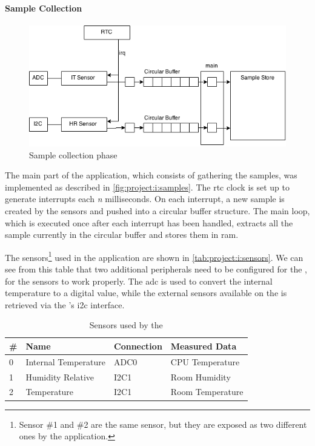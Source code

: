 \paragraph{Sample Collection}
\label{sec:project:i:sample-collection}

\begin{figure}[H]
  \begin{center}
    \includegraphics[scale=0.5]{figures/project-i.png}
  \end{center}
  \caption{Sample collection phase}
  \label{fig:project:i:samples}
\end{figure}

The main part of the application, which consists of gathering the samples, was implemented as described in \autoref{fig:project:i:samples}.
The \gls{rtc} clock is set up to generate interrupts each \emph{n} milliseconds.
On each interrupt, a new sample is created by the sensors and pushed into a circular buffer structure.
The main loop, which is executed once after each interrupt has been handled, extracts all the sample currently in the circular buffer and stores them in \gls{ram}.

The sensors\footnote{Sensor \#1 and \#2 are the same sensor, but they are exposed as two different ones by the application.} used in the application are shown in \autoref{tab:project:i:sensors}.
We can see from this table that two additional peripherals need to be configured for the {\tracker}, for the sensors to work properly.
The \gls{adc} is used to convert the internal temperature to a digital value, while the external sensors available on the {\BIO} is retrieved via the {\gecko}'s \gls{i2c} interface.

\begin{table}[H]
  \centering
  \begin{tabular}{ l | l | l | l }
    \textbf{\#} & \textbf{Name} & \textbf{Connection} & \textbf{Measured Data} \\
    \hline
    0 & Internal Temperature & ADC0 & CPU Temperature \\
    1 & Humidity Relative & I2C1 & Room Humidity \\
    2 & Temperature & I2C1 & Room Temperature \\
    \hline
  \end{tabular}
  \caption{Sensors used by the {\tracker}}
  \label{tab:project:i:sensors}
\end{table}

